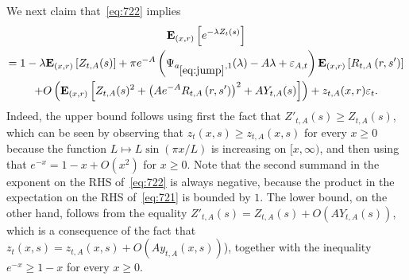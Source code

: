 \documentclass[AHL,Unicode,longabstracts,published]{cedram}
\newcommand*\eps{\varepsilon}
\newcommand*\E{\mathbf{E}}
\newcommand{\1} {\mathds{1}}
\begin{document}
We next claim that~\eqref{eq:722} implies
\begin{multline}\label{eq:723}
\E_{(x,r)}\left[e^{-\lambda Z_t(s)}\right]\\
= 1-\lambda \E_{(x,r)}\left[Z_{t,A}(s)\right] + \pi e^{-A}\left(\Psi_{a_{\eqref{eq:jump}},1}(\lambda) - A\lambda + \eps_{A,t}\right)\E_{(x,r)}\left[R_{t,A}\left(r,s'\right)\right]\\
+ O\left(\E_{(x,r)}\left[Z_{t,A}(s)^2 + \left(Ae^{-A}R_{t,A}\left(r,s'\right)\right)^2 + AY_{t,A}(s)\right]\right) + z_{t,A}(x,r)\eps_t.
\end{multline}
Indeed, the upper bound follows using first the fact that $Z'_{t,A}(s)\ge Z_{t,A}(s)$, which can be seen by observing that $z_t(x,s) \ge z_{t,A}(x,s)$ for every $x\ge0$ because the function $L \mapsto L \sin(\pi x/L)$ is increasing on $[x, \infty)$, and then using that $e^{-x} = 1-x+O(x^2)$ for $x\ge0$. Note that the second summand in the exponent on the RHS of~\eqref{eq:722} is always negative, because the product in the expectation on the RHS of~\eqref{eq:721} is bounded by $1$. The lower bound, on the other hand, follows from the equality $Z'_{t,A}(s) = Z_{t,A}(s) + O(A Y_{t,A}(s))$, which is a consequence of the fact that $z_t(x,s) = z_{t,A}(x,s) + O(Ay_{t,A}(x,s))$), together with the inequality $e^{-x} \ge 1-x$ for every $x\ge 0$.
\end{document}
